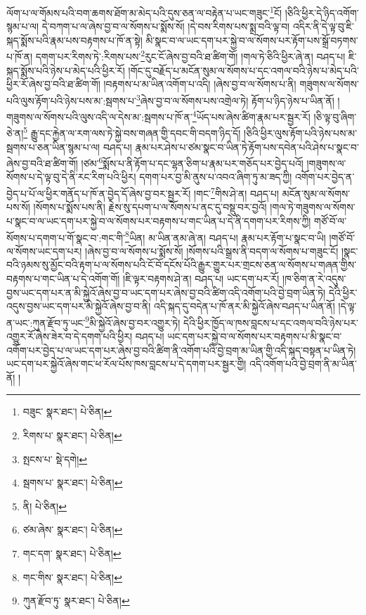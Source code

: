 ལོག་པ་ལ་གོམས་པའི་བག་ཆགས་ཐོག་མ་མེད་པའི་དུས་ཅན་ལ་བརྟེན་པ་ཡང་གཟུང་\footnote{བཟུང་  སྣར་ཐང་།  པེ་ཅིན། }ངོ། །ཅིའི་ཕྱིར་དེ་ཉིད་འགོག་སྙམ་པ་ལ། དེ་བཀག་པ་ལ་ཞེས་བྱ་བ་ལ་སོགས་པ་སྨོས་སོ། །དེ་བས་རིགས་པས་སྨྲ་བའི་ལྟ་བ། འདིར་ནི་དེ་ལྟ་བུ་ཇི་སྐད་སྨོས་པའི་རྣམ་པས་བརྟགས་པ་ཁོ་ན་སྟེ། མི་སྣང་བ་ལ་ཡང་དག་པར་སྐྱེ་བ་ལ་སོགས་པར་རྟོག་པས་སྒྲོ་བཏགས་པ་ཁོ་ན། དགག་པར་རིགས་ཏེ་:རིགས་པས་\footnote{རིགས་པ་  སྣར་ཐང་།  པེ་ཅིན། }རུང་ངོ་ཞེས་བྱ་བའི་ཐ་ཚིག་གོ། །གལ་ཏེ་ཅིའི་ཕྱིར་ཞེ་ན། བཤད་པ། ཇི་སྐད་སྨོས་པའི་ཉེས་པ་མེད་པའི་ཕྱིར་རོ། །གོང་དུ་བརྗོད་པ་མངོན་སུམ་ལ་སོགས་པ་དང་འགལ་བའི་ཉེས་པ་མེད་པའི་ཕྱིར་རོ་ཞེས་བྱ་བའི་ཐ་ཚིག་གོ། །བརྟགས་པ་མ་ཡིན་འགོག་པ་འདི། །ཞེས་བྱ་བ་ལ་སོགས་པ་ནི། གཟུགས་ལ་སོགས་པའི་ལུས་རྟོག་པའི་ཉེས་པས་མ་:སྦགས་པ་\footnote{སྤངས་པ་  སྡེ་དགེ། }ཞེས་བྱ་བ་ལ་སོགས་པས་འགྲེལ་ཏེ། རྟོག་པ་ཉིད་ཉེས་པ་ཡིན་ནོ། །གཟུགས་ལ་སོགས་པའི་ལུས་འདི་ལ་དེས་མ་:སྦགས་པ་ཁོ་ན་\footnote{སྦགས་པ་  སྣར་ཐང་།  པེ་ཅིན། }ཡོད་པས་ཞེས་ཚིག་རྣམ་པར་སྦྱར་རོ། །ཅི་ལྟ་བུ་ཞིག་ཅེ་ན།\footnote{ནི།  པེ་ཅིན། } རྒྱུ་དང་རྐྱེན་ལ་རག་ལས་ཏེ་སྐྱེ་བས་གཞན་གྱི་དབང་གི་བདག་ཉིད་དོ། །ཅིའི་ཕྱིར་ལུས་རྟོག་པའི་ཉེས་པས་མ་སྦགས་པ་ཅན་ཡིན་སྙམ་པ་ལ། བཤད་པ། རྣམ་པར་ཤེས་པ་ཙམ་སྣང་བ་ཡིན་ཏེ་རྟོག་པས་དབེན་པའི་ཤེས་པ་སྣང་བ་ཞེས་བྱ་བའི་ཐ་ཚིག་གོ། །ཙམ་\footnote{ཙམ་ཞེས་  སྣར་ཐང་།  པེ་ཅིན། }སྨོས་པ་ནི་རྟོག་པ་དང་ལྷན་ཅིག་པ་རྣམ་པར་གཅོད་པར་བྱེད་པའོ། །གཟུགས་ལ་སོགས་པ་དེ་ལྟ་བུ་དེ་ནི་རང་རིག་པའི་ཕྱིར། དགག་པར་བྱ་མི་ནུས་པ་འབའ་ཞིག་ཏུ་མ་ཟད་ཀྱི། འགོག་པར་བྱེད་ན་བྱེད་པ་པོ་ལ་ཕྱིར་གནོད་པ་ཁོ་ན་བྱེད་དོ་ཞེས་བྱ་བར་སྦྱར་རོ། །གང་\footnote{གང་དག་  སྣར་ཐང་།  པེ་ཅིན། }གིས་ཤེ་ན། བཤད་པ། མངོན་སུམ་ལ་སོགས་པས་སོ། །སོགས་པ་སྨོས་པས་ནི། རྗེས་སུ་དཔག་པ་ལ་སོགས་པ་ནང་དུ་བསྡུ་བར་བྱའོ། །གལ་ཏེ་གཟུགས་ལ་སོགས་པ་སྣང་བ་ལ་ཡང་དག་པར་སྐྱེ་བ་ལ་སོགས་པར་བརྟགས་པ་གང་ཡིན་པ་དེ་ནི་དགག་པར་རིགས་ཀྱི། གཙོ་བོ་ལ་སོགས་པ་དགག་པ་གོ་སྣང་བ་:གང་གི་\footnote{གང་གིས་  སྣར་ཐང་།  པེ་ཅིན། }ཡིན། མ་ཡིན་ནམ་ཞེ་ན། བཤད་པ། རྣམ་པར་རྟོག་པ་སྣང་བ་ཡི། །གཙོ་བོ་ལ་སོགས་ཡང་དག་པར། །ཞེས་བྱ་བ་ལ་སོགས་པ་སྨོས་སོ། །སོགས་པའི་སྒྲས་ནི་བདག་ལ་སོགས་པ་གཟུང་ངོ། །སྣང་བའི་ཉམས་སུ་མྱོང་བའི་རྟག་པ་ལ་སོགས་པའི་ངོ་བོ་དངོས་པོའི་རྒྱུར་གྱུར་པར་གྲངས་ཅན་ལ་སོགས་པ་གཞན་གྱིས་བརྟགས་པ་གང་ཡིན་པ་དེ་འགོག་གོ། །ཇི་ལྟར་བརྟགས་ཤེ་ན། བཤད་པ། ཡང་དག་པར་རོ། །ཁ་ཅིག་ན་རེ་འདུས་བྱས་ཡང་དག་པར་ན་མི་སྐྱེའོ་ཞེས་བྱ་བ་ཡང་དག་པར་ཞེས་བྱ་བའི་ཚིག་འདི་འགོག་པའི་བྱེ་བྲག་ཡིན་ཏེ། དེའི་ཕྱིར་འདུས་བྱས་ཡང་དག་པར་མི་སྐྱེའོ་ཞེས་བྱ་བ་ནི། འདི་སྐད་དུ་བདེན་པ་ཁོ་ནར་མི་སྐྱེའོ་ཞེས་བཤད་པ་ཡིན་ནོ། །དེ་ལྟ་ན་ཡང་:ཀུན་རྫོབ་ཏུ་ཡང་\footnote{ཀུན་རྫོབ་ཏུ་  སྣར་ཐང་།  པེ་ཅིན། }མི་སྐྱེའོ་ཞེས་བྱ་བར་འགྱུར་ཏེ། དེའི་ཕྱིར་ཁྱོད་ལ་ཁས་བླངས་པ་དང་འགལ་བའི་ཉེས་པར་འགྱུར་རོ་ཞེས་ཟེར་བ་དེ་དགག་པའི་ཕྱིར། བཤད་པ། ཡང་དག་པར་སྐྱེ་བ་ལ་སོགས་པར་བརྟགས་པ་མི་སྣང་བ་འགོག་པར་བྱེད་པ་ལ་ཡང་དག་པར་ཞེས་བྱ་བའི་ཚིག་ནི་འགོག་པའི་བྱེ་བྲག་མ་ཡིན་གྱི་འདི་སྐད་བསྟན་པ་ཡིན་ཏེ། ཡང་དག་པར་སྐྱེའོ་ཞེས་གང་ཕ་རོལ་པོས་ཁས་བླངས་པ་དེ་དགག་པར་སྦྱར་གྱི། འདི་འགོག་པའི་བྱེ་བྲག་ནི་མ་ཡིན་ནོ། །
